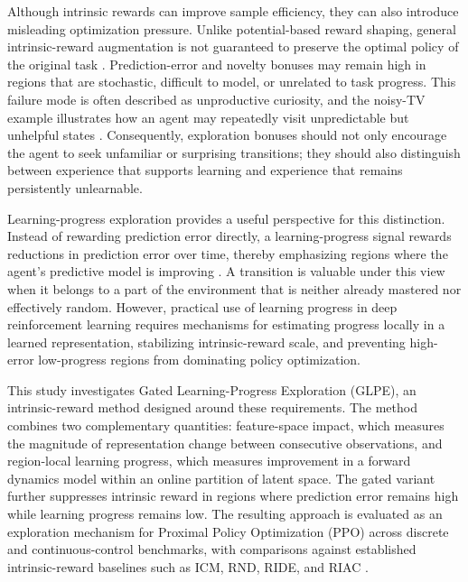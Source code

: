 Although intrinsic rewards can improve sample efficiency, they can also introduce misleading optimization pressure.
Unlike potential-based reward shaping, general intrinsic-reward augmentation is not guaranteed to preserve the optimal policy of the original task \parencite{ng-1999}.
Prediction-error and novelty bonuses may remain high in regions that are stochastic, difficult to model, or unrelated to task progress.
This failure mode is often described as unproductive curiosity, and the noisy-TV example illustrates how an agent may repeatedly visit unpredictable but unhelpful states \parencite{mavor-parker-2021}.
Consequently, exploration bonuses should not only encourage the agent to seek unfamiliar or surprising transitions; they should also distinguish between experience that supports learning and experience that remains persistently unlearnable.

Learning-progress exploration provides a useful perspective for this distinction.
Instead of rewarding prediction error directly, a learning-progress signal rewards reductions in prediction error over time, thereby emphasizing regions where the agent's predictive model is improving \parencite{schmidhuber-1991,oudeyer-2007A,baranes-2009}.
A transition is valuable under this view when it belongs to a part of the environment that is neither already mastered nor effectively random.
However, practical use of learning progress in deep reinforcement learning requires mechanisms for estimating progress locally in a learned representation, stabilizing intrinsic-reward scale, and preventing high-error low-progress regions from dominating policy optimization.

This study investigates Gated Learning-Progress Exploration (GLPE), an intrinsic-reward method designed around these requirements.
The method combines two complementary quantities: feature-space impact, which measures the magnitude of representation change between consecutive observations, and region-local learning progress, which measures improvement in a forward dynamics model within an online partition of latent space.
The gated variant further suppresses intrinsic reward in regions where prediction error remains high while learning progress remains low.
The resulting approach is evaluated as an exploration mechanism for Proximal Policy Optimization (PPO) across discrete and continuous-control benchmarks, with comparisons against established intrinsic-reward baselines such as ICM, RND, RIDE, and RIAC \parencite{schulman-2017,pathak-2017,burda-2018B,raileanu-2020,baranes-2009}.